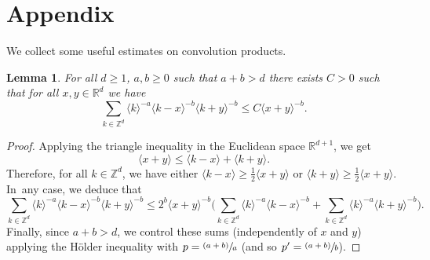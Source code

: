 \documentclass[JEP,XML,SOM,Unicode,NoEqCountersInSection,published]{cedram}
\newcommand{\psfrac}[2]{\sfrac{(#1)}{#2}}
\newtheorem{lemma}[theorem]{Lemma}
\theoremstyle{definition}
\begin{document}
\section{Appendix}
We collect some useful estimates on convolution products.
\begin{lemma}
\label{lem_conv1}
For all $d\geq 1$, $a,b\geq 0$ such that $a+b>d$ there exists $C>0$ such that for all $x,y\in \mathbb{R}^d$ we have
\[
\sum_{k\in \mathbb{Z}^d} \langle k \rangle^{-a} \langle k-x \rangle^{-b} \langle k+ y\rangle^{-b} \leq C \langle x+y\rangle^{-b}.
\]
\end{lemma}
\begin{proof} Applying the triangle inequality in the Euclidean space $\mathbb{R}^{d+1}$, we get
\[
\langle x+y \rangle \leq \langle k-x \rangle + \langle k+ y\rangle.
\]
Therefore, for all $k\in \mathbb{Z}^d$, we have either $\langle k-x \rangle\geq \frac12 \langle x+y \rangle$ or $\langle k+y \rangle\geq \frac12 \langle x+y \rangle$. In~any case, we deduce that
\[
\sum_{k\in \mathbb{Z}^d} \langle k \rangle^{-a} \langle k-x \rangle^{-b} \langle k+ y\rangle^{-b} \leq 2^{b} \langle x+y\rangle^{-b} \biggl(\sum_{k\in \mathbb{Z}^d} \langle k \rangle^{-a} \langle k-x \rangle^{-b} + \sum_{k\in \mathbb{Z}^d} \langle k \rangle^{-a} \langle k+y \rangle^{-b} \biggr).
\]
Finally, since $a+b>d$, we control these sums (independently of $x$ and $y$) applying the Hölder inequality with $p = \psfrac{a+b}a$ (and so $p'= \psfrac{a+b}b$).
\end{proof}
\end{document}
